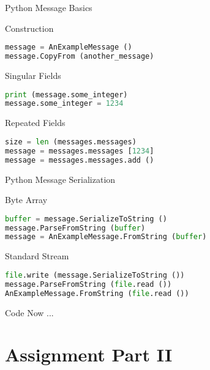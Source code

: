 \begin{frame}[fragile]{Python Message Basics}
    \begin{block}{Construction}
\begin{lstlisting}[language=python,style=mini]
message = AnExampleMessage ()
message.CopyFrom (another_message)
\end{lstlisting}
    \end{block}
    \begin{block}{Singular Fields}
\begin{lstlisting}[language=python,style=mini]
print (message.some_integer)
message.some_integer = 1234
\end{lstlisting}
    \end{block}
    \begin{block}{Repeated Fields}
\begin{lstlisting}[language=python,style=mini]
size = len (messages.messages)
message = messages.messages [1234]
message = messages.messages.add ()
\end{lstlisting}
    \end{block}
\end{frame}


\begin{frame}[fragile]{Python Message Serialization}
    \begin{block}{Byte Array}
\begin{lstlisting}[language=python,style=mini]
buffer = message.SerializeToString ()
message.ParseFromString (buffer)
message = AnExampleMessage.FromString (buffer)
\end{lstlisting}
    \end{block}

    \bigskip

    \begin{block}{Standard Stream}
\begin{lstlisting}[language=python,style=mini]
file.write (message.SerializeToString ())
message.ParseFromString (file.read ())
AnExampleMessage.FromString (file.read ())
\end{lstlisting}
    \end{block}
\end{frame}


\begin{frame}{Code Now ...}
\end{frame}


\section{Assignment Part II}


